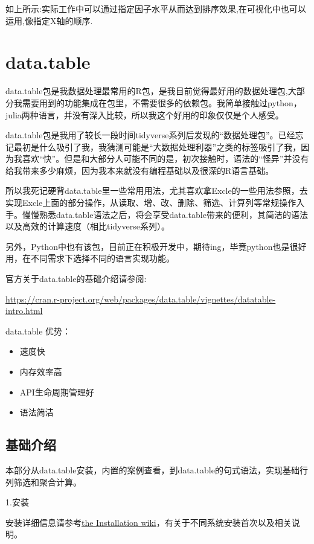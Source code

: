 \documentclass[
]{book}
\providecommand{\tightlist}{%
  \setlength{\itemsep}{0pt}\setlength{\parskip}{0pt}}
\begin{document}
如上所示:实际工作中可以通过指定因子水平从而达到排序效果,在可视化中也可以运用,像指定X轴的顺序.

\hypertarget{data.table}{%
\chapter{data.table}\label{data.table}}

data.table包是我数据处理最常用的R包，是我目前觉得最好用的数据处理包,大部分我需要用到的功能集成在包里，不需要很多的依赖包。我简单接触过python，julia两种语言，并没有深入比较，所以我这个好用的印象仅仅是个人感受。

data.table包是我用了较长一段时间tidyverse系列后发现的``数据处理包''。已经忘记最初是什么吸引了我，我猜测可能是``大数据处理利器''之类的标签吸引了我，因为我喜欢``快''。但是和大部分人可能不同的是，初次接触时，语法的``怪异''并没有给我带来多少麻烦，因为我本来就没有编程基础以及很深的R语言基础。

所以我死记硬背data.table里一些常用用法，尤其喜欢拿Excle的一些用法参照，去实现Excle上面的部分操作，从读取、增、改、删除、筛选、计算列等常规操作入手。慢慢熟悉data.table语法之后，将会享受data.table带来的便利，其简洁的语法以及高效的计算速度（相比tidyverse系列）。

另外，Python中也有该包，目前正在积极开发中，期待ing，毕竟python也是很好用，在不同需求下选择不同的语言实现功能。

官方关于data.table的基础介绍请参阅:

\url{https://cran.r-project.org/web/packages/data.table/vignettes/datatable-intro.html}

data.table 优势：

\begin{itemize}
\tightlist
\item
  速度快
\item
  内存效率高
\item
  API生命周期管理好
\item
  语法简洁
\end{itemize}

\hypertarget{ux57faux7840ux4ecbux7ecd}{%
\section{基础介绍}\label{ux57faux7840ux4ecbux7ecd}}

本部分从data.table安装，内置的案例查看，到data.table的句式语法，实现基础行列筛选和聚合计算。

1.安装

安装详细信息请参考\href{https://github.com/Rdatatable/data.table/wiki/Installation}{the Installation wiki}，有关于不同系统安装首次以及相关说明。
\end{document}
